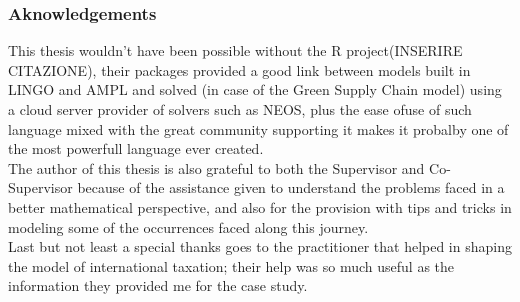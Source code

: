 \begin{doublespace}
\subsubsection{Aknowledgements}
This thesis wouldn't have been possible without the R project(INSERIRE CITAZIONE), their packages provided a good link between models built in LINGO and AMPL and solved (in case of the Green Supply Chain model) using a cloud server provider of solvers such as NEOS, plus the ease ofuse of such language mixed with the great community supporting it makes it probalby one of the most powerfull language ever created. 
\\
The author of this thesis is also grateful to both the Supervisor and Co-Supervisor because of the assistance given to understand the problems faced in a better mathematical perspective, and also for the provision with tips and tricks in modeling some of the occurrences faced along this journey.
\\
Last but not least a special thanks goes to the practitioner that helped in shaping the model of international taxation; their help was so much useful as the information they provided me for the case study.    
\end{doublespace}

\clearpage{\pagestyle{empty}\cleardoublepage}
